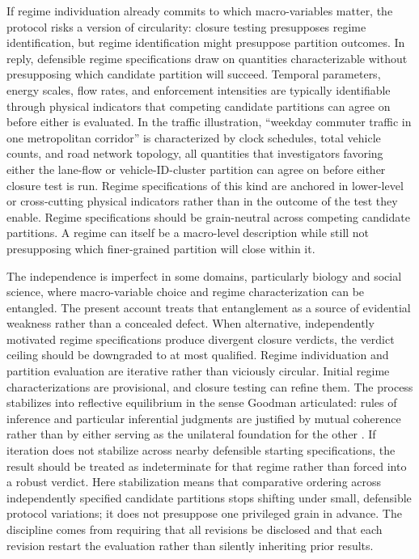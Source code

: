 If regime individuation already commits to which macro-variables
matter, the protocol risks a version of circularity: closure testing
presupposes regime identification, but regime identification might
presuppose partition outcomes. In reply, defensible regime
specifications draw on quantities characterizable without presupposing
which candidate partition will succeed. Temporal parameters, energy
scales, flow rates, and enforcement intensities are typically
identifiable through physical indicators that competing candidate
partitions can agree on before either is evaluated. In the traffic
illustration, ``weekday commuter traffic in one metropolitan corridor''
is characterized by clock schedules, total vehicle counts, and road
network topology, all quantities that investigators favoring either the
lane-flow or vehicle-ID-cluster partition can agree on before either
closure test is run. Regime specifications of this kind are anchored in
lower-level or cross-cutting physical indicators rather than in the
outcome of the test they enable. Regime specifications should be
grain-neutral across competing candidate partitions. A regime can itself be a macro-level description while
still not presupposing which finer-grained partition will close
within it.

The independence is imperfect in some domains, particularly biology and
social science, where macro-variable choice and regime characterization
can be entangled. The present account treats that entanglement as a
source of evidential weakness rather than a concealed defect. When
alternative, independently motivated regime specifications produce
divergent closure verdicts, the verdict ceiling should be downgraded to
at most qualified. Regime individuation and partition evaluation are
iterative rather than viciously circular. Initial regime characterizations are provisional, and closure
testing can refine them. The process stabilizes into reflective
equilibrium in the sense Goodman articulated: rules of inference and
particular inferential judgments are justified by mutual coherence
rather than by either serving as the unilateral foundation for the
other \citep{goodman1955}. If iteration does not stabilize across nearby
defensible starting specifications, the result should be treated as
indeterminate for that regime rather than forced into a robust verdict.
Here stabilization means that comparative ordering across independently
specified candidate partitions stops shifting under small, defensible
protocol variations; it does not presuppose one privileged grain in
advance.
The discipline comes from requiring that all revisions be disclosed and
that each revision restart the evaluation rather than silently inheriting
prior results.

